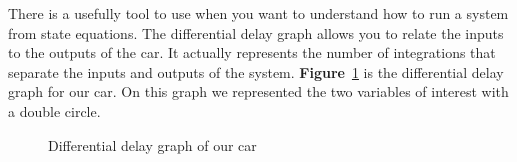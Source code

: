 There is a usefully tool to use when you want to understand
how to run a system from state equations. The differential delay
graph allows you to relate the inputs to the outputs of the car.
It actually represents the number of integrations that separate the
inputs and outputs of the system. \textbf{Figure}~\ref{fig:diff_delay}
is the differential delay graph for our car. On this graph we represented
the two variables of interest with a double circle.

\begin{figure}[!ht]
    \centering
    \caption{Differential delay graph of our car}
    \label{fig:diff_delay}
\end{figure}

\newpage